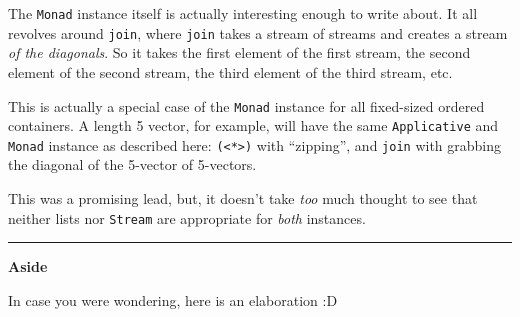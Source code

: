 \documentclass[]{article}
\begin{document}
The \texttt{Monad} instance itself is actually interesting enough to write
about. It all revolves around \texttt{join}, where \texttt{join} takes a stream
of streams and creates a stream \emph{of the diagonals}. So it takes the first
element of the first stream, the second element of the second stream, the third
element of the third stream, etc.

This is actually a special case of the \texttt{Monad} instance for all
fixed-sized ordered containers. A length 5 vector, for example, will have the
same \texttt{Applicative} and \texttt{Monad} instance as described here:
\texttt{(\textless{}*\textgreater{})} with ``zipping'', and \texttt{join} with
grabbing the diagonal of the 5-vector of 5-vectors.

This was a promising lead, but, it doesn't take \emph{too} much thought to see
that neither lists nor \texttt{Stream} are appropriate for \emph{both}
instances.

\begin{center}\rule{0.5\linewidth}{\linethickness}\end{center}

\textbf{Aside}

In case you were wondering, here is an elaboration :D
\end{document}
